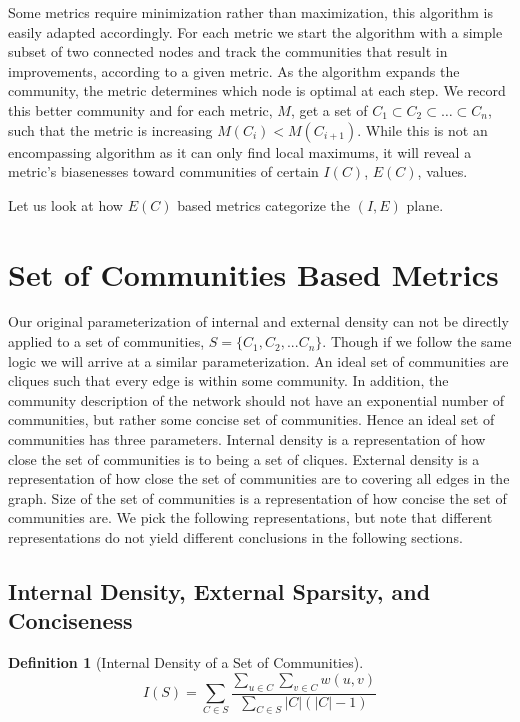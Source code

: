\documentclass[phd,tocprelim]{cornell}
\newtheorem{definition}{Definition}
\begin{document}
Some metrics require minimization rather than maximization, this algorithm is easily adapted accordingly.
For each metric we start the algorithm with a simple subset of two connected nodes and track the communities that result in improvements, according to a given metric. As the algorithm expands the community, the metric determines which node is optimal at each step. We record this better community and for each metric, $M$, get a set of $C_1 \subset C_2 \subset \dots \subset C_n$, such that the metric is increasing $M(C_i) < M(C_{i+1})$. While this is not an encompassing algorithm as it can only find local maximums, it will reveal a metric’s biasenesses toward communities of certain $I(C)$, $E(C)$, values.

Let us look at how $E(C)$ based metrics categorize the $(I, E)$ plane.

\section{Set of Communities Based Metrics}

Our original parameterization of internal and external density can not be directly applied to a set of communities, $S = \{C_1,C_2,...C_n\}$. Though if we follow the same logic we will arrive at a similar parameterization. An ideal set of communities are cliques such that every edge is within some community. In addition, the community description of the network should not have an exponential number of communities, but rather some concise set of communities. Hence an ideal set of communities has three parameters. Internal density is a representation of how close the set of communities is to being a set of cliques. External density is a representation of how close the set of communities are to covering all edges in the graph. Size of the set of communities is a representation of how concise the set of communities are. We pick the following representations, but note that different representations do not yield different conclusions in the following sections.

\subsection{Internal Density, External Sparsity, and Conciseness}

\begin{definition}[Internal Density of a Set of Communities]
\begin{equation}
I(S) = \sum_{C \in S} \frac{\sum_{u \in C} \sum_{v \in C} w(u,v)}{\sum_{C \in S}|C|(|C| − 1)}
\end{equation}
\label{def_int_set}
\end{definition}
\end{document}
